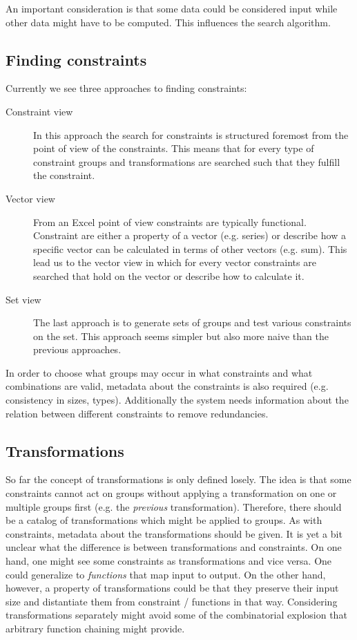\documentclass[a4paper]{article}
\begin{document}
An important consideration is that some data could be considered input while other data might have to be computed.
This influences the search algorithm.

\subsection{Finding constraints}
Currently we see three approaches to finding constraints:

\begin{description}
	\item[Constraint view] In this approach the search for constraints is structured foremost from the point of view of the constraints.
	This means that for every type of constraint groups and transformations  are searched such that they fulfill the constraint.
	\item[Vector view] From an Excel point of view constraints are typically functional.
	Constraint are either a property of a vector (e.g. series) or describe how a specific vector can be calculated in terms of other vectors (e.g. sum).
	This lead us to the vector view in which for every vector constraints are searched that hold on the vector or describe how to calculate it.
	\item[Set view] The last approach is to generate sets of groups and test various constraints on the set.
	This approach seems simpler but also more naive than the previous approaches.
\end{description}

In order to choose what groups may occur in what constraints and what combinations are valid, metadata about the constraints is also required (e.g. consistency in sizes, types).
Additionally the system needs information about the relation between different constraints to remove redundancies.

\subsection{Transformations}
So far the concept of transformations is only defined losely.
The idea is that some constraints cannot act on groups without applying a transformation on one or multiple groups first (e.g. the \textit{previous} transformation).
Therefore, there should be a catalog of transformations which might be applied to groups.
As with constraints, metadata about the transformations should be given.
It is yet a bit unclear what the difference is between transformations and constraints.
On one hand, one might see some constraints as transformations and vice versa.
One could generalize to \textit{functions} that map input to output.
On the other hand, however, a property of transformations could be that they preserve their input size and distantiate them from constraint / functions in that way.
Considering transformations separately might avoid some of the combinatorial explosion that arbitrary function chaining might provide.
\end{document}
